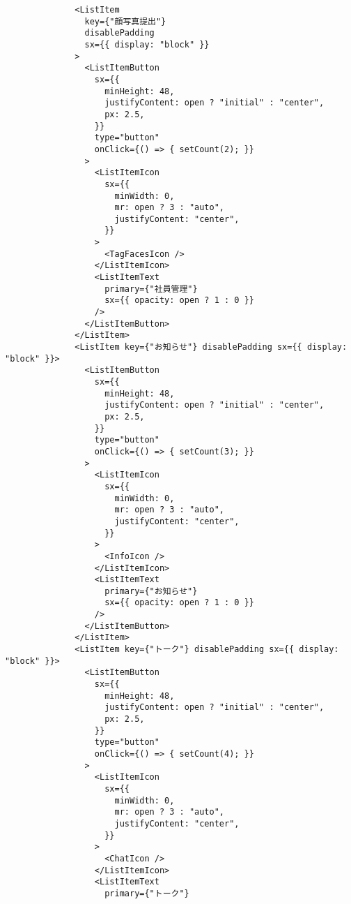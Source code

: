 \begin{verbatim}
              <ListItem
                key={"顔写真提出"}
                disablePadding
                sx={{ display: "block" }}
              >
                <ListItemButton
                  sx={{
                    minHeight: 48,
                    justifyContent: open ? "initial" : "center",
                    px: 2.5,
                  }}
                  type="button"
                  onClick={() => { setCount(2); }}
                >
                  <ListItemIcon
                    sx={{
                      minWidth: 0,
                      mr: open ? 3 : "auto",
                      justifyContent: "center",
                    }}
                  >
                    <TagFacesIcon />
                  </ListItemIcon>
                  <ListItemText
                    primary={"社員管理"}
                    sx={{ opacity: open ? 1 : 0 }}
                  />
                </ListItemButton>
              </ListItem>
              <ListItem key={"お知らせ"} disablePadding sx={{ display: "block" }}>
                <ListItemButton
                  sx={{
                    minHeight: 48,
                    justifyContent: open ? "initial" : "center",
                    px: 2.5,
                  }}
                  type="button"
                  onClick={() => { setCount(3); }}
                >
                  <ListItemIcon
                    sx={{
                      minWidth: 0,
                      mr: open ? 3 : "auto",
                      justifyContent: "center",
                    }}
                  >
                    <InfoIcon />
                  </ListItemIcon>
                  <ListItemText
                    primary={"お知らせ"}
                    sx={{ opacity: open ? 1 : 0 }}
                  />
                </ListItemButton>
              </ListItem>
              <ListItem key={"トーク"} disablePadding sx={{ display: "block" }}>
                <ListItemButton
                  sx={{
                    minHeight: 48,
                    justifyContent: open ? "initial" : "center",
                    px: 2.5,
                  }}
                  type="button"
                  onClick={() => { setCount(4); }}
                >
                  <ListItemIcon
                    sx={{
                      minWidth: 0,
                      mr: open ? 3 : "auto",
                      justifyContent: "center",
                    }}
                  >
                    <ChatIcon />
                  </ListItemIcon>
                  <ListItemText
                    primary={"トーク"}

\end{verbatim}
